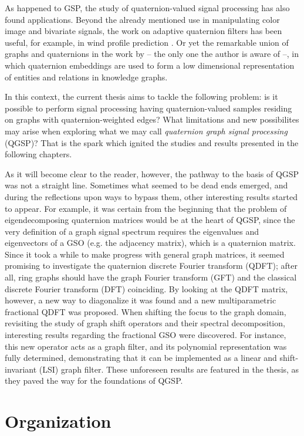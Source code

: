 As happened to GSP, the study of quaternion-valued signal processing has also found applications. Beyond the already mentioned use in manipulating color image and bivariate signals, the work on adaptive quaternion filters has been useful, for example, in wind profile prediction \cite{jiang2014general}. Or yet the remarkable union of graphs and quaternions in the work by \cite{zhang2019quaternion} -- the only one the author is aware of --, in which quaternion embeddings are used to form a low dimensional representation of entities and relations in knowledge graphs.

In this context, the current thesis aims to tackle the following problem: is it possible to perform signal processing having quaternion-valued samples residing on graphs with quaternion-weighted edges? What limitations and new possibilites may arise when exploring what we may call \textit{quaternion graph signal processing} (QGSP)? That is the spark which ignited the studies and results presented in the following chapters.

As it will become clear to the reader, however, the pathway to the basis of QGSP was not a straight line. Sometimes what seemed to be dead ends emerged, and during the reflections upon ways to bypass them, other interesting results started to appear. For example, it was certain from the beginning that the problem of eigendecomposing quaternion matrices would be at the heart of QGSP, since the very definition of a graph signal spectrum requires the eigenvalues and eigenvectors of a GSO (e.g. the adjacency matrix), which is a quaternion matrix. Since it took a while to make progress with general graph matrices, it seemed promising to investigate the quaternion discrete Fourier transform (QDFT); after all, ring graphs should have the graph Fourier transform (GFT) and the classical discrete Fourier transform (DFT) coinciding. By looking at the QDFT matrix, however, a new way to diagonalize it was found and a new multiparametric fractional QDFT was proposed. When shifting the focus to the graph domain, revisiting the study of graph shift operators and their spectral decomposition, interesting results regarding the fractional GSO were discovered. For instance, this new operator acts as a graph filter, and its polynomial representation was fully determined, demonstrating that it can be implemented as a linear and shift-invariant (LSI) graph filter. These unforeseen results are featured in the thesis, as they paved the way for the foundations of QGSP.

\section{Organization}

